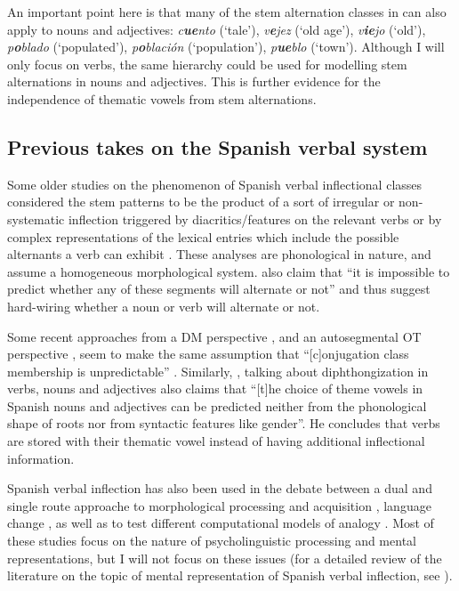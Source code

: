 An important point here is that many of the stem alternation classes in  can also apply to nouns and adjectives: \textit{c\textbf{ue}nto} (`tale'), \textit{v\textbf{e}jez} (`old age'), \textit{v\textbf{ie}jo} (`old'), \textit{p\textbf{o}blado} (`populated'), \textit{p\textbf{o}blación} (`population'), \textit{p\textbf{ue}blo} (`town'). Although I will only focus on verbs, the same hierarchy could be used for modelling stem alternations in nouns and adjectives. This is further evidence for the independence of thematic vowels from stem alternations.

\subsection{Previous takes on the Spanish verbal system}

Some older studies on the phenomenon of Spanish verbal inflectional classes considered the stem patterns to be the product of a sort of irregular or non-systematic inflection triggered by diacritics/features on the relevant verbs \autocites{FoleyJr.1965, Brame.1973, Harris.1969, Harris.1978} or by complex representations of the lexical entries which include the possible alternants a verb can exhibit \autocite{Hooper.1976}. These analyses are phonological in nature, and assume a homogeneous morphological system. \textcite[43]{Brame.1973} also claim that ``it is impossible to predict whether any of these segments will alternate or not'' and thus suggest hard-wiring whether a noun or verb will alternate or not.

Some recent approaches from a DM perspective \autocite{Arregi.2000}, and an autosegmental OT perspective \autocite{Roca.2010}, seem to make the same assumption that ``[c]onjugation class membership is unpredictable'' \autocite[412]{Roca.2010}. Similarly, \textcite[3]{Bermudez-Otero.2013a}, talking about diphthongization in verbs, nouns and adjectives also claims that ``[t]he choice of theme vowels in Spanish nouns and adjectives can be predicted neither from the phonological shape of roots nor from syntactic features like gender''. He concludes that verbs are stored with their thematic vowel instead of having additional inflectional information.

Spanish verbal inflection has also been used in the debate between a dual and single route approache to morphological processing and acquisition \autocites{Brovetto.2005, Clahsen.2002, Costanzo.2011, Eddington.2009, Yaden.2003}, language change \autocite{GalvanTorres.2007, Wanner.2006}, as well as to test different computational models of analogy \autocite{Albright.2009}. Most of these studies focus on the nature of psycholinguistic processing and mental representations, but I will not focus on these issues (for a detailed review of the literature on the topic of mental representation of Spanish verbal inflection, see \citealt{Eddington.2009}).


